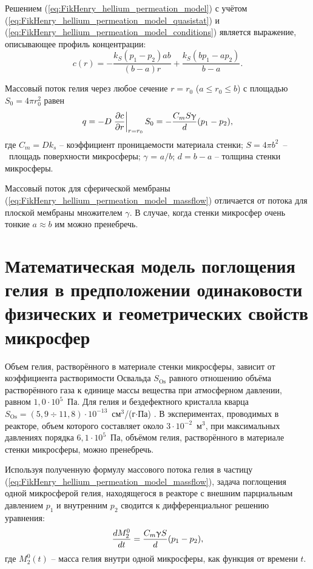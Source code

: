 Решением (\ref{eq:FikHenry_hellium_permeation_model}) с учётом (\ref{eq:FikHenry_hellium_permeation_model_quasistat}) и (\ref{eq:FikHenry_hellium_permeation_model_conditions}) является выражение, описывающее профиль концентрации:
\begin{equation}
\label{eq:eq:FikHenry_hellium_permeation_model_solution}
c(r) = -\frac{k_S(p_1-p_2)ab}{(b-a)r}+\frac{k_S(bp_1-ap_2)}{b-a}.
\end{equation}

Массовый поток гелия через любое сечение $r=r_0$ ($a\leq r_0 \leq b$) с площадью $S_0=4\pi r_0^2$ равен
\begin{equation}
\label{eq:FikHenry_hellium_permeation_model_massflow}
q = -D \left. \frac{\partial c}{\partial r} \right|_{r=r_0}S_0=-\frac{C_m S \upgamma}{d}(p_1-p_2),
\end{equation}
где $C_m = D k_s$ -- коэффициент проницаемости материала стенки; $S=4 \pi b^2$~--~площадь поверхности микросферы; $\gamma$ = $a/b$; $d=b-a$ -- толщина стенки микросферы.

Массовый поток для сферической мембраны (\ref{eq:FikHenry_hellium_permeation_model_massflow}) отличается от потока для плоской мембраны \cite{Hvang, Ditnerskiy, Mulder} множителем $\gamma$. В случае, когда стенки микросфер очень тонкие $a \approx b$ им можно пренебречь.

\section{Математическая модель поглощения гелия в предположении одинаковости физических и геометрических свойств микросфер}
 \label{section_2_2}

Объем гелия, растворённого в материале стенки микросферы, зависит от коэффициента растворимости Освальда $S_{\mathrm{Os}}$ равного отношению объёма растворённого газа к единице массы вещества при атмосферном давлении, равном $1,0 \cdot 10^5$~Па. Для гелия и бездефектного кристалла кварца $S_{\mathrm{Os}}=(5,9 \div 11,8) \cdot 10^{-13}$~см$^3$/(г$\cdot$Па) \cite{Argunova_Sorokin}. В экспериментах, проводимых в реакторе, объем которого составляет около $3\cdot 10^{-2}$~м$^3$, при максимальных давлениях порядка $6,1\cdot 10^5$~Па, объёмом гелия, растворённого в материале стенки микросферы, можно пренебречь.

Используя полученную формулу массового потока гелия в частицу  (\ref{eq:FikHenry_hellium_permeation_model_massflow}), задача поглощения одной микросферой гелия, находящегося в реакторе с внешним парциальным давлением $p_1$ и внутренним $p_2$ сводится к дифференциальног решению уравнения:
\begin{equation}
\label{eq:one_particle_permiation}
\frac{dM^0_2}{dt}= \frac{C_m\upgamma S}{d}(p_1-p_2),
\end{equation}
где $M^0_2(t)$ -- масса гелия внутри одной микросферы, как функция от времени $t$. 

